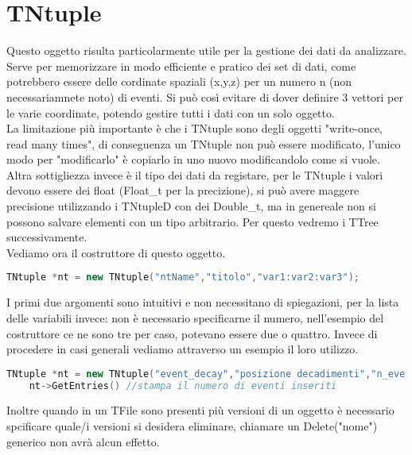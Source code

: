 \section{TNtuple}
Questo oggetto risulta particolarmente utile per la gestione dei dati da analizzare. Serve per memorizzare in modo efficiente e pratico dei set di dati, come potrebbero essere delle cordinate spaziali (x,y,z) per un numero n (non necessariamnete noto) di eventi. Si può così evitare di dover definire 3 vettori per le varie coordinate, potendo gestire tutti i dati con un solo oggetto.\\
La limitazione più importante è che i TNtuple sono degli oggetti "write-once, read many times", di conseguenza un TNtuple non può essere modificato, l'unico modo per "modificarlo" è copiarlo in uno nuovo modificandolo come si vuole. Altra sottigliezza invece è il tipo dei dati da registare, per le TNtuple i valori devono essere dei float (Float\_t per la precizione), si può avere maggere precisione utilizzando i TNtupleD con dei Double\_t, ma in genereale non si possono salvare elementi con un tipo arbitrario. Per questo vedremo i TTree successivamente.\\
Vediamo ora il costruttore di questo oggetto.
\begin{lstlisting}[language=C++,label={cod1},mathescape=true,breaklines=true]
	TNtuple *nt = new TNtuple("ntName","titolo","var1:var2:var3");
\end{lstlisting}
I primi due argomenti sono intuitivi e non necessitano di spiegazioni, per la lista delle variabili invece: non è necessario specificarne il numero, nell'esempio del costruttore ce ne sono tre per caso, potevano essere due o quattro. Invece di procedere in casi generali vediamo attraverso un esempio il loro utilizzo.
\begin{lstlisting}[language=C++,label={cod1},mathescape=true,breaklines=true]
	TNtuple *nt = new TNtuple("event_decay","posizione decadimenti","n_eve:x:y:z"); //costruttore
	nt->GetEntries() //stampa il numero di eventi inseriti
\end{lstlisting}
Inoltre quando in un TFile sono presenti più versioni di un oggetto è necessario spcificare quale/i versioni si desidera eliminare, chiamare un Delete("nome") generico non avrà alcun effetto.


